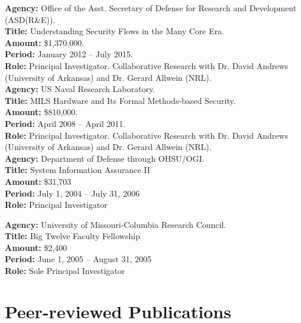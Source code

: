 \documentclass[12pt]{article} %
\begin{document}
{\bf Agency:} Office of the Asst. Secretary of Defense for Research and Development (ASD(R\&E)).
\\
{\bf Title:} Understanding Security Flows in the Many Core Era.
\\
{\bf Amount:} \$1,370,000.
\\
{\bf Period:}   January 2012  --  July 2015.
\\
{\bf Role:}      Principal Investigator. Collaborative Research with Dr. David Andrews (University of Arkansas) and Dr. Gerard Allwein (NRL).
\\

{\bf Agency:} US Naval Research Laboratory.
\\
{\bf Title:} MILS Hardware and Its Formal Methods-based Security.
\\
{\bf Amount:} \$810,000.
\\
{\bf Period:}   April 2008  --  April 2011.
\\
{\bf Role:}      Principal Investigator. Collaborative Research with Dr. David Andrews (University of Arkansas) and Dr. Gerard Allwein (NRL).
\\


{\bf Agency:} Department of Defense through OHSU/OGI.
\\
{\bf Title:} System Information Assurance II
\\
{\bf Amount:} \$31,703 
\\
{\bf Period:}   July 1, 2004  --  July 31, 2006
\\
{\bf Role:}      Principal Investigator


{\bf Agency:} University of Missouri-Columbia Research Council.
\\
{\bf Title:} Big Twelve Faculty Fellowship
\\
{\bf Amount:} \$2,400
\\
{\bf Period:}   June 1, 2005  --  August 31, 2005 
\\
{\bf Role:}      Sole Principal Investigator
\\


\section*{Peer-reviewed Publications}
\end{document}
